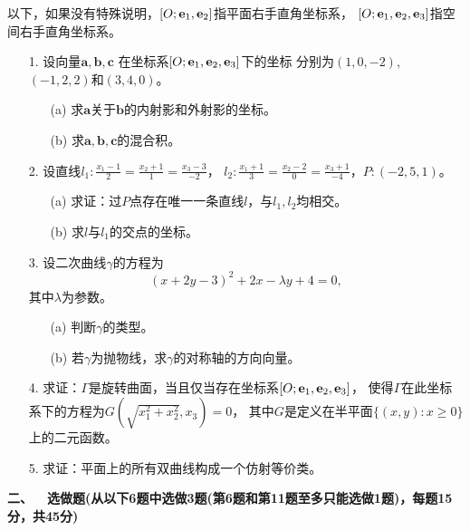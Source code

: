 \qquad 以下，如果没有特殊说明，$[O;\mathbf{e}_1,\mathbf{e}_2]$指平面右手直角坐标系，
$[O;\mathbf{e}_1,\mathbf{e}_2,\mathbf{e}_3]$指空间右手直角坐标系。
\begin{itemize}
    \item[1.] 设向量$\mathbf{a},\mathbf{b},\mathbf{c}$
    在坐标系$[O;\mathbf{e}_1,\mathbf{e}_2,\mathbf{e}_3]$下的坐标
    分别为$(1,0,-2)$, $(-1,2,2)$和$(3,4,0)$。
    \begin{itemize}
        \item[(a)] 求$\mathbf{a}$关于$\mathbf{b}$的内射影和外射影的坐标。
        \item[(b)] 求$\mathbf{a},\mathbf{b},\mathbf{c}$的混合积。
    \end{itemize}
    \item[2.] 设直线$l_1:\frac{x_1-1}{2}=\frac{x_2+1}{1}=\frac{x_3-3}{-2}$，
    $l_2:\frac{x_1+1}{3}=\frac{x_2-2}{0}=\frac{x_3+1}{-4}$，$P:(-2,5,1)$。
    \begin{itemize}
        \item[(a)] 求证：过$P$点存在唯一一条直线$l$，与$l_1,l_2$均相交。
        \item[(b)] 求$l$与$l_1$的交点的坐标。
    \end{itemize}
    \item[3.] 设二次曲线$\gamma$的方程为
    \[(x+2y-3)^2+2x-\lambda y+4=0,\]
    其中$\lambda$为参数。
    \begin{itemize}
        \item[(a)] 判断$\gamma$的类型。
        \item[(b)] 若$\gamma$为抛物线，求$\gamma$的对称轴的方向向量。
    \end{itemize}
    \item[4.] 求证：$\Gamma$是旋转曲面，当且仅当存在坐标系$[O;\mathbf{e}_1,\mathbf{e}_2,\mathbf{e}_3]$，
    使得$\Gamma$在此坐标系下的方程为$G(\sqrt{x_1^2+x_2^2},x_3)=0$，
    其中$G$是定义在半平面$\{(x,y):x\ge0\}$上的二元函数。
    \item[5.] 求证：平面上的所有双曲线构成一个仿射等价类。
\end{itemize}
\textbf{二、\ \ 选做题(从以下6题中选做3题(第6题和第11题至多只能选做1题)，每题15分，共45分)}

